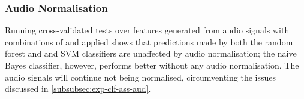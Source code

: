             
        
        \subsubsection{Audio Normalisation}
        \label{subsubsec:exp-clf-opt-normaud}
            Running cross-validated tests over features generated from audio signals with combinations of  and  applied shows that predictions made by both the random forest and and SVM classifiers are unaffected by audio normalisation; the naive Bayes classifier, however, performs better without any audio normalisation. The audio signals will continue not being normalised, circumventing the issues discussed in \ref{subsubsec:exp-clf-ass-aud}.
